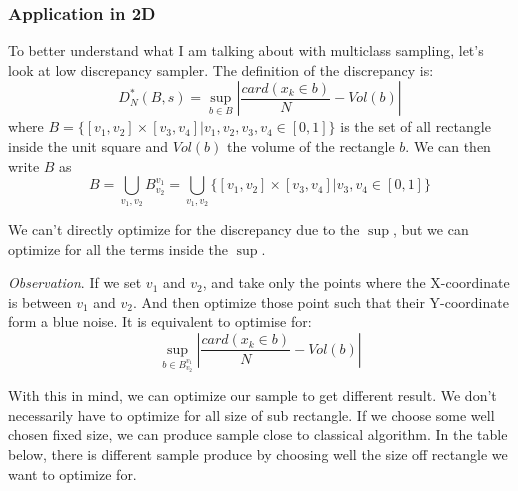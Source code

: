 \documentclass{classeENS}
\begin{document}
\subsubsection{Application in 2D}

    \> To better understand what I am talking about with multiclass sampling, let's look at
    low discrepancy sampler. The definition of the discrepancy is:
    \[ D_N^*(B,s) = \sup_{b\in B} \left | \frac{card(x_k \in b)}{N} - Vol(b)\right |\]
    where $B = \{[v_1,v_2]\times[v_3,v_4] | v_1,v_2,v_3,v_4 \in [0,1]\}$ is the set of all 
    rectangle inside the unit square and $Vol(b)$ the volume of the rectangle $b$. We can then write $B$ as 
    \[B =  \bigcup_{v_1,v_2} B_{v_2}^{v_1} = 
    \bigcup_{v_1,v_2} \{[v_1,v_2]\times[v_3,v_4] | v_3,v_4 \in [0,1]\}\]

    \> We can't directly optimize for the discrepancy due to the $\sup$, but we can optimize
    for all the terms inside the $\sup$.

    \> \textit{Observation}. If we set $v_1$ and $v_2$, and take only the points where the
    X-coordinate is between $v_1$ and $v_2$. And then optimize those point such that their 
    Y-coordinate form a blue noise. It is equivalent to optimise for:
    \[ \sup_{b\in B_{v_2}^{v_1}} \left | \frac{card(x_k \in b)}{N} - Vol(b)\right | \]

    \> With this in mind, we can optimize our sample to get different result.
    We don't necessarily have to optimize for all size of sub rectangle. If we choose
    some well chosen fixed size, we can produce sample close to classical algorithm. 
    In the table below, there is different sample produce by choosing well the size off
    rectangle we want to optimize for.
\end{document}
